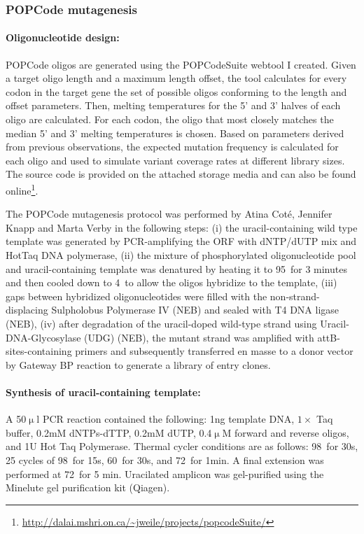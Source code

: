 \subsubsection{POPCode mutagenesis} 
\paragraph{Oligonucleotide design:} POPCode oligos are generated using the POPCodeSuite webtool I created. Given a target oligo length and a maximum length offset, the tool calculates for every codon in the target gene the set of possible oligos conforming to the length and offset parameters. Then, melting temperatures for the 5' and 3' halves of each oligo are calculated. For each codon, the oligo that most closely matches the median 5' and 3' melting temperatures is chosen. Based on parameters derived from previous observations, the expected mutation frequency is calculated for each oligo and used to simulate variant coverage rates at different library sizes. The source code is provided on the attached storage media and can also be found online\footnote{
\url{http://dalai.mshri.on.ca/~jweile/projects/popcodeSuite/}
}.

The POPCode mutagenesis protocol was performed by Atina Cot\'e, Jennifer Knapp and Marta Verby in the following steps: (i) the uracil-containing wild type template was generated by PCR-amplifying the ORF with dNTP/dUTP mix and HotTaq DNA polymerase, (ii) the mixture of phosphorylated oligonucleotide pool and uracil-containing template was denatured by heating it to 95\celsius\ for 3 minutes and then cooled down to 4\celsius\ to allow the oligos hybridize to the template, (iii) gaps between hybridized oligonucleotides were filled with the non-strand-displacing Sulpholobus Polymerase IV (NEB) and sealed with T4 DNA ligase (NEB), (iv) after degradation of the uracil-doped wild-type strand using Uracil-DNA-Glycosylase (UDG) (NEB), the mutant strand was amplified with attB-sites-containing primers and subsequently transferred en masse to a donor vector by Gateway BP reaction to generate a library of entry clones. 

\paragraph{Synthesis of uracil-containing template:} A 50$\upmu$l PCR reaction contained the following: 1ng template DNA, $1\times$ Taq buffer, 0.2mM dNTPs-dTTP, 0.2mM dUTP, 0.4$\upmu$M forward and reverse oligos, and 1U Hot Taq Polymerase.  Thermal cycler conditions are as follows: 98\celsius\ for 30s, 25 cycles of 98\celsius\ for 15s, 60\celsius\ for 30s, and 72\celsius\ for 1min. A final extension was performed at 72\celsius\ for 5 min.  Uracilated amplicon was gel-purified using the Minelute gel purification kit (Qiagen). 


